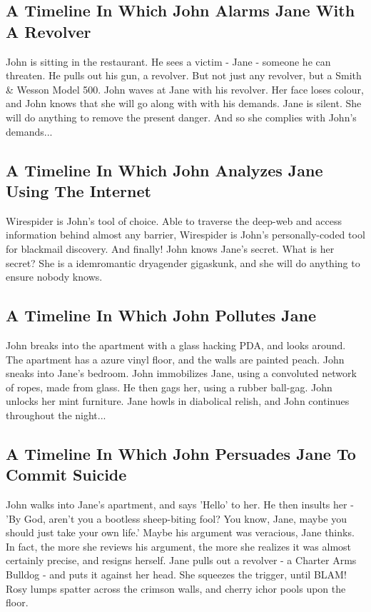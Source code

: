 \documentclass{article}
\begin{document}
\subsection{A Timeline In Which John Alarms Jane With A Revolver}


John is sitting in the restaurant.
He sees a victim {-} Jane {-} someone he can threaten. He pulls out his gun, a revolver.
But not just any revolver, but a Smith \& Wesson Model 500.
John waves at Jane with his revolver. Her face loses colour, and John knows that she will go along with with his demands.
Jane is silent. She will do anything to remove the present danger. And so she complies with John's demands...
\subsection{A Timeline In Which John Analyzes Jane Using The Internet}


Wirespider is John's tool of choice. Able to traverse the deep{-}web and access information behind almost any barrier, Wirespider is John's personally{-}coded tool for blackmail discovery.
And finally!
John knows Jane's secret. What is her secret? She is a idemromantic dryagender gigaskunk, and she will do anything to ensure nobody knows.
\subsection{A Timeline In Which John Pollutes Jane}


John breaks into the apartment with a glass hacking PDA, and looks around.
The apartment has a azure vinyl floor, and the walls are painted peach.
John sneaks into Jane's bedroom.
John immobilizes Jane, using a convoluted network of ropes, made from glass.
He then gags her, using a rubber ball{-}gag.
John unlocks her mint furniture.
Jane howls in diabolical relish, and John continues throughout the night...
\subsection{A Timeline In Which John Persuades Jane To Commit Suicide}


John walks into Jane's apartment, and says 'Hello' to her.
He then insults her {-} 'By God, aren't you a bootless sheep{-}biting fool?
You know, Jane, maybe you should just take your own life.'
Maybe his argument was veracious, Jane thinks.
In fact, the more she reviews his argument, the more she realizes it was almost certainly precise, and resigns herself.
Jane pulls out a revolver {-} a Charter Arms Bulldog {-} and puts it against her head.
She squeezes the trigger, until BLAM!
Rosy lumps spatter across the crimson walls, and cherry ichor pools upon the floor.
\end{document}
